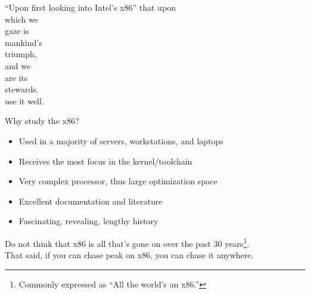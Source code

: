 \documentclass[mathserif,xcolor={dvipsnames,table}]{beamer}
\begin{document}
{
\begin{frame}{``Upon first looking into Intel's x86''}
\hfill that upon\\
\hfill which we \\
\hfill gaze is\\
\hfill mankind's\\
\hfill triumph,\\
\vspace{.8in}
\hfill and we\\
\hfill are its\\
\hfill stewards.\\
\vspace{.5in}
\hfill use it well.\\
\end{frame}
}

\begin{frame}{Why study the x86?}
\begin{itemize}
\item Used in a majority of servers, workstations, and laptops
\item Receives the most focus in the kernel/toolchain
\item Very complex processor, thus large optimization space
\item Excellent documentation and literature
\item Fascinating, revealing, lengthy history
\end{itemize}
\vfill
\vspace{.35in}
Do not think that x86 is all that's gone on over the past
30 years\footnote{Commonly expressed as ``All the world's an x86.''}.\\
\vspace{.35in}
That said, if you can chase peak on x86, you can chase it anywhere.
\end{frame}
\end{document}
